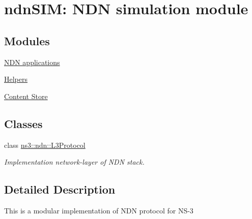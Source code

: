 \hypertarget{group__ndn}{}\section{ndn\+S\+IM\+: N\+DN simulation module}
\label{group__ndn}
\subsection*{Modules}
\begin{DoxyCompactItemize}
\item 
\hyperlink{group__ndn-apps}{N\+D\+N applications}
\item 
\hyperlink{group__ndn-helpers}{Helpers}
\item 
\hyperlink{group__ndn-cs}{Content Store}
\end{DoxyCompactItemize}
\subsection*{Classes}
\begin{DoxyCompactItemize}
\item 
class \hyperlink{classns3_1_1ndn_1_1L3Protocol}{ns3\+::ndn\+::\+L3\+Protocol}
\begin{DoxyCompactList}\small\item\em Implementation network-\/layer of N\+DN stack. \end{DoxyCompactList}\end{DoxyCompactItemize}


\subsection{Detailed Description}
This is a modular implementation of N\+DN protocol for N\+S-\/3 